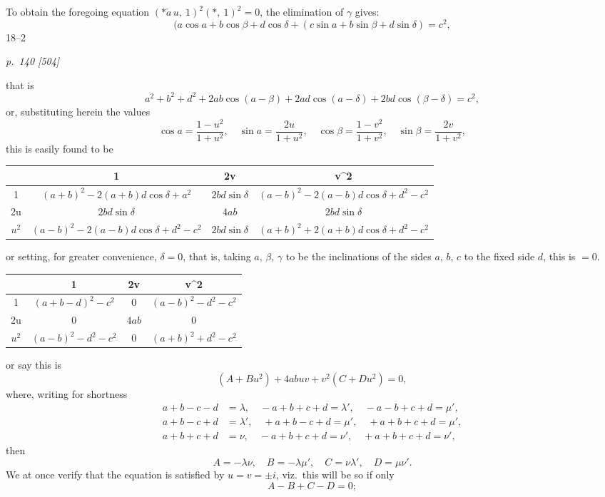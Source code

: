 \documentclass[11pt,a4paper]{book}
\begin{document}
To obtain the foregoing equation $(\ast\check{a}\,u,\ 1)^2 (\ast,\ 1)^2 = 0$, the elimination of $\gamma$ gives:
\[
(a\cos a + b\cos\beta + d\cos\delta + (c\sin a + b\sin\beta + d\sin\delta) = c^2,
\]
\hfill 18--2

\clearpage

\bigskip
\textit{p.~140 [504]}
\smallskip

\noindent
that is
\[
a^2 + b^2 + d^2 + 2ab \cos(a - \beta) + 2ad \cos(a - \delta) + 2bd \cos(\beta - \delta) = c^2,
\]
or, substituting herein the values
\[
\cos a = \frac{1 - u^2}{1 + u^2}, \quad \sin a = \frac{2u}{1 + u^2}, \quad \cos\beta = \frac{1 - v^2}{1 + v^2}, \quad \sin\beta = \frac{2v}{1 + v^2},
\]
this is easily found to be
\begin{center}
\begin{tabular}{c|c|c|c}
 & 1 & 2v & v^2 \\
\hline
1 & $(a + b)^2 - 2(a + b)d\cos\delta + a^2$ & $2bd\sin\delta$ & $(a - b)^2 - 2(a - b)d\cos\delta + d^2 - c^2$ \\
\hline
2u & $2bd\sin\delta$ & $4ab$ & $2bd\sin\delta$ \\
\hline
$u^2$ & $(a - b)^2 - 2(a - b)d\cos\delta + d^2 - c^2$ & $2bd\sin\delta$ & $(a + b)^2 + 2(a + b)d\cos\delta + d^2 - c^2$
\end{tabular}
\end{center}
or setting, for greater convenience, $\delta = 0$, that is, taking $a$, $\beta$, $\gamma$ to be the inclinations
of the sides $a$, $b$, $c$ to the fixed side $d$, this is $= 0$.

\begin{center}
\begin{tabular}{c|c|c|c}
 & 1 & 2v & v^2 \\
\hline
1 & $(a + b - d)^2 - c^2$ & $0$ & $(a - b)^2 - d^2 - c^2$ \\
\hline
2u & $0$ & $4ab$ & $0$ \\
\hline
$u^2$ & $(a - b)^2 - d^2 - c^2$ & $0$ & $(a + b)^2 + d^2 - c^2$
\end{tabular}
\end{center}
or say this is
\[
(A + Bu^2) + 4abuv + v^2(C + Du^2) = 0,
\]
where, writing for shortness
\begin{align*}
a + b - c - d &= \lambda, \quad -a + b + c + d = \lambda', \quad -a - b + c + d = \mu',\\
a + b - c + d &= \lambda', \quad +a + b - c + d = \mu', \quad +a + b + c + d = \mu',\\
a + b + c + d &= \nu, \quad -a + b + c + d = \nu', \quad +a + b + c + d = \nu',
\end{align*}
then
\[
A = -\lambda\nu, \quad B = -\lambda\mu', \quad C = \nu\lambda', \quad D = \mu\nu'.
\]
We at once verify that the equation is satisfied by $u = v = \pm i$, viz.\ this will be so
if only
\[
A - B + C - D = 0;
\]
\end{document}
